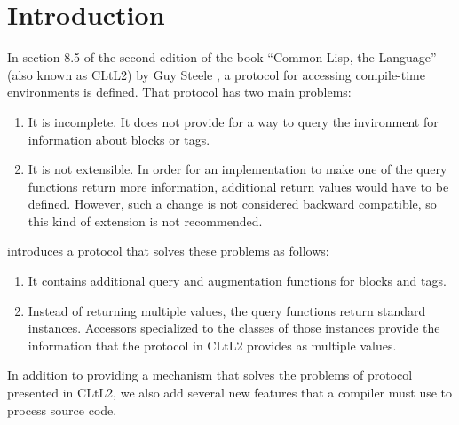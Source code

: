 \chapter{Introduction}
%

In section 8.5 of the second edition of the book ``Common Lisp, the
Language'' (also known as CLtL2) by Guy Steele
\cite{Steele:1990:CLL:95411}, a protocol for accessing compile-time
environments is defined.  That protocol has two main problems:

\begin{enumerate}
\item It is incomplete.  It does not provide for a way to query the
  invironment for information about blocks or tags.
\item It is not extensible.  In order for an implementation to make
  one of the query functions return more information, additional
  return values would have to be defined.  However, such a change is
  not considered backward compatible, so this kind of extension is not
  recommended.
\end{enumerate}

\sysname{} introduces a protocol that solves these problems as
follows:

\begin{enumerate}
\item It contains additional query and augmentation functions for
  blocks and tags.
\item Instead of returning multiple values, the query functions return
  standard instances.  Accessors specialized to the classes of those
  instances provide the information that the protocol in CLtL2
  provides as multiple values.
\end{enumerate}

In addition to providing a mechanism that solves the problems of
protocol presented in CLtL2, we also add several new features that
a compiler must use to process source code.
